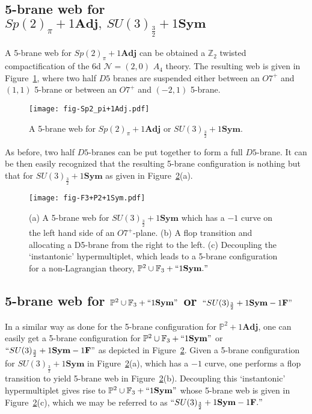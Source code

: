 \subsection{\texorpdfstring{5-brane web for $Sp(2)_\pi+1\mathbf{Adj},~ SU(3)_{\frac32}+1\mathbf{Sym}$}{5-brane web for Sp(2)pi + 1Adj}}

A 5-brane web for $Sp(2)_\pi + 1\mathbf{Adj}$ can be obtained a $\mathbb{Z}_2$ twisted compactification of the 6d $\mathcal{N}=(2,0)$ $A_4$ theory. The resulting web is given in Figure~\ref{fig:Sp2_pi+1Adj}, where two half $D5$ branes are suspended either between an $O7^+$ and $(1,1)$ 5-brane or between an $O7^+$ and $(-2, 1)$ 5-brane. 
\begin{figure}
\centering	
\texttt{[image: fig-Sp2\_pi+1Adj.pdf]}
\caption{A 5-brane web for $Sp(2)_\pi + 1\mathbf{Adj}$ or $SU(3)_\frac32+1\mathbf{Sym}$.}
\label{fig:Sp2_pi+1Adj}
\end{figure}
As before, two half $D5$-branes can be put together to form a full $D5$-brane. It can be then easily recognized that the resulting 5-brane configuration is nothing but that for $SU(3)_\frac32+1\mathbf{Sym}$ as given in Figure~\ref{fig:F3+P2+1Sym}(a).

\begin{figure}[t]
	\texttt{[image: fig-F3+P2+1Sym.pdf]}
	\centering	
	\caption{(a) A 5-brane web for $SU(3)_\frac32+1\mathbf{Sym}$ which has a $-1$ curve on the left hand side of an $O7^+$-plane. (b) A flop transition and allocating a D5-brane from the right to the left. (c)  Decoupling the `instantonic' hypermultiplet, which leads to a 5-brane configuration for a non-Lagrangian theory, $\mathbb{P}^2\cup\mathbb{F}_3+``1\mathbf{Sym}."$}
	\label{fig:F3+P2+1Sym}
\end{figure}
\subsection{\texorpdfstring{5-brane web for $\mathbb{P}^2\cup\mathbb{F}_3+``1\mathbf{Sym}"$ or $ ``SU(3)_{\frac32}+1\mathbf{Sym}-1\mathbf{F}"$}{5-brane web for P2 U F3 + 1Sym}}\label{sec:app-P2 U F3+1Sym}
In a similar way as done for the 5-brane configuration for $\mathbb{P}^2+1\mathbf{Adj}$, one can easily get a 5-brane configuration for $\mathbb{P}^2\cup\mathbb{F}_3+``1\mathbf{Sym}"$ or $ ``SU(3)_{\frac32}+1\mathbf{Sym}-1\mathbf{F}"$ as depicted in Figure~\ref{fig:F3+P2+1Sym}. Given a 5-brane configuration for $SU(3)_\frac32+1\mathbf{Sym}$ in Figure~\ref{fig:F3+P2+1Sym}(a), which has a $-1$ curve, one performs a flop transition to yield 5-brane web in Figure~\ref{fig:F3+P2+1Sym}(b). Decoupling this `instantonic' hypermultiplet gives rise to $\mathbb{P}^2\cup\mathbb{F}_3+``1\mathbf{Sym}"$ whose 5-brane web is given in Figure~\ref{fig:F3+P2+1Sym}(c), which we may be referred to as $ ``SU(3)_{\frac32}+1\mathbf{Sym}-1\mathbf{F}."$



